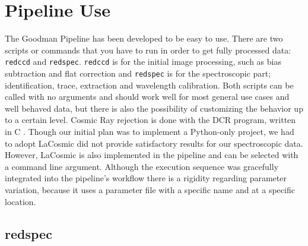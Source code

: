 \documentclass[11pt,twoside]{article}
\begin{document}
\section{Pipeline Use}
The Goodman Pipeline has been developed to be easy to use. There are two scripts
or commands that you have to run in order to get fully processed data:
\verb=redccd= and \verb=redspec=.
\verb=redccd= is for the initial image processing, such as bias
subtraction and flat correction and \verb=redspec= is for the spectroscopic
part; identification, trace, extraction and wavelength calibration.
Both scripts can be called with no arguments and should work well for most general use cases
and well behaved data, but there is also the possibility of customizing the behavior
up to a certain level. Cosmic Ray rejection is done with the DCR program,
written in C \citep{2004PASP..116..148P}. Though our initial plan was to
implement a Python-only project, we had to adopt LaCosmic
\citep{2001PASP..113.1420V} did not provide satisfactory results for our
spectroscopic data. However, LaCosmic is also implemented in the pipeline and
can be selected with a command line argument. Although the execution sequence
was gracefully integrated into the pipeline's workflow there is a rigidity
regarding parameter variation, because it uses a parameter file with a specific
name and at a specific location.


\subsection{redspec}
\end{document}
